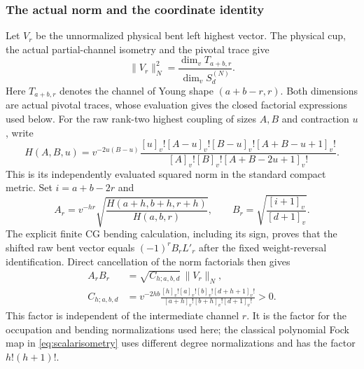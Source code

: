 \documentclass[10pt,a4paper]{article}
\newcommand{\qf}[1]{[#1]_v!}
\newenvironment{revision}{\begingroup}{\endgroup}
\begin{document}
\begin{revision}
\subsubsection*{The actual norm and the coordinate identity}
Let $V_r$ be the unnormalized physical bent left highest vector. The
physical cup, the actual partial-channel isometry and the pivotal trace give
\begin{equation}\label{eq:certIInorm}
 \|V_r\|_N^2=
 \frac{\dim_v T_{a+b,r}}{\dim_v S_d^{(N)}}.
\end{equation}
Here $T_{a+b,r}$ denotes the channel of Young shape $(a+b-r,r)$.
Both dimensions are actual pivotal traces, whose evaluation gives the
closed factorial expressions used below.
For the raw rank-two highest coupling of sizes $A,B$ and contraction $u$,
write
\[
 H(A,B,u)=v^{-2u(B-u)}
 \frac{\qf u\qf{A-u}\qf{B-u}\qf{A+B-u+1}}
      {\qf A\qf B\qf{A+B-2u+1}}.
\]
This is its independently evaluated squared norm in the standard compact
metric. Set $i=a+b-2r$ and
\[
 A_r=v^{-hr}\sqrt{\frac{H(a+h,b+h,r+h)}{H(a,b,r)}},
 \qquad B_r=\sqrt{\frac{[i+1]_v}{[d+1]_v}}.
\]
The explicit finite CG bending calculation, including its sign, proves that
the shifted raw bent vector equals $(-1)^rB_rL'_r$ after the fixed
weight-reversal identification. Direct cancellation of the norm factorials
then gives
\begin{align}
 A_rB_r&=\sqrt{C_{h;a,b,d}}\,\|V_r\|_N,\label{eq:certIIuniversal}\\
 C_{h;a,b,d}
 &=v^{-2hb}\frac{\qf h\qf a\qf b\qf{d+h+1}}
                      {\qf{a+h}\qf{b+h}\qf{d+1}}>0.
 \label{eq:certIIC}
\end{align}
This factor is independent of the intermediate channel $r$. It is the
factor for the occupation and bending normalizations used here; the
classical polynomial Fock map in \eqref{eq:scalarisometry} uses different
degree normalizations and has the factor $h!(h+1)!$.


\end{revision}
\end{document}
